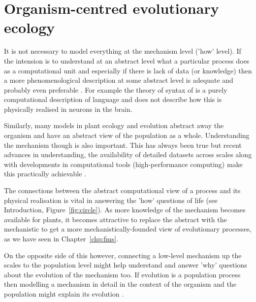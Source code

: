 


\section{Organism-centred evolutionary ecology}
\label{sec:ecology}
It is not necessary to model everything at the mechanism level ('how' level). If
the intension is to understand at an abstract level what a particular process
does as a computational unit and especially if there is lack of data (or
knowledge) then a more phenomenological description at some abstract level is
adequate and probably even preferable \citep[see levels of description
of][Chapter 1]{marr_vision:_1982}. For example the theory of syntax of
\citet{chomsky_aspects_2014} is a purely computational description of language
and does not describe how this is physically realised in neurons in the brain.

Similarly, many models in plant ecology and evolution abstract away the organism
and have an abstract view of the population as a whole. Understanding the
mechanism though is also important. This has always been true but recent
advances in understanding, the availability of detailed datasets across scales
along with developments in computational tools (\eg high-performance computing)
make this practically achievable \citep{zhu_plants_2016,
  marshall-colon_crops_2017}.

The connections between the abstract computational view of a process and its
physical realisation is vital in answering the 'how' questions of life (see
Introduction, Figure~\ref{fig:circle}). As more knowledge of the mechanism
becomes available for plants, it becomes attractive to replace the abstract with
the mechanistic to get a more mechanistically-founded view of evolutionary
processes, as we have seen in Chapter~\ref{chp:fms}.

On the opposite side of this however, connecting a low-level mechanism up the
scales to the population level might help understand and answer 'why' questions
about the evolution of the mechanism too. If evolution is a population process
\citep{doebeli_towards_2017} then modelling a mechanism in detail in the context
of the organism and the population might explain its evolution
\citep[\enquote{Nothing in biology makes sense except in light of population
  genetics};][]{lynch_origins_2007}.

